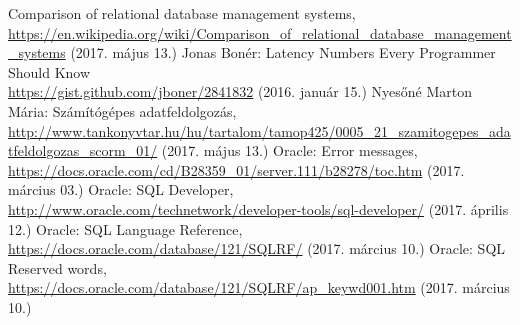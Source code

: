 

\begin{thebibliography}{}

Comparison of relational database management systems, \url{https://en.wikipedia.org/wiki/Comparison_of_relational_database_management_systems} (2017. május 13.)
Jonas Bonér: Latency Numbers Every Programmer Should Know \\
\url{https://gist.github.com/jboner/2841832} (2016. január 15.)
Nyesőné Marton Mária: Számítógépes adatfeldolgozás, \url{http://www.tankonyvtar.hu/hu/tartalom/tamop425/0005_21_szamitogepes_adatfeldolgozas_scorm_01/} (2017. május 13.)
Oracle: Error messages, \url{https://docs.oracle.com/cd/B28359_01/server.111/b28278/toc.htm} (2017. március 03.)
Oracle: SQL Developer, \url{http://www.oracle.com/technetwork/developer-tools/sql-developer/} (2017. április 12.)
Oracle: SQL Language Reference, \url{https://docs.oracle.com/database/121/SQLRF/} (2017. március 10.)
Oracle: SQL Reserved words, \url{https://docs.oracle.com/database/121/SQLRF/ap_keywd001.htm} (2017. március 10.)

\end{thebibliography}